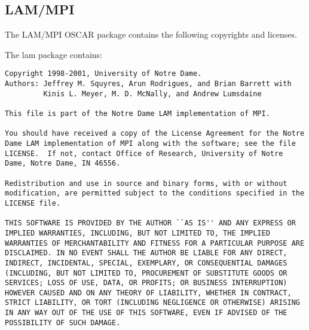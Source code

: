 %
%
%

\subsection{LAM/MPI}
The LAM/MPI OSCAR package contains the following copyrights and licenses.

The lam package contains:

\begin{verbatim}
Copyright 1998-2001, University of Notre Dame.
Authors: Jeffrey M. Squyres, Arun Rodrigues, and Brian Barrett with
         Kinis L. Meyer, M. D. McNally, and Andrew Lumsdaine

This file is part of the Notre Dame LAM implementation of MPI.

You should have received a copy of the License Agreement for the Notre
Dame LAM implementation of MPI along with the software; see the file
LICENSE.  If not, contact Office of Research, University of Notre
Dame, Notre Dame, IN 46556.

Redistribution and use in source and binary forms, with or without
modification, are permitted subject to the conditions specified in the
LICENSE file.

THIS SOFTWARE IS PROVIDED BY THE AUTHOR ``AS IS'' AND ANY EXPRESS OR
IMPLIED WARRANTIES, INCLUDING, BUT NOT LIMITED TO, THE IMPLIED
WARRANTIES OF MERCHANTABILITY AND FITNESS FOR A PARTICULAR PURPOSE ARE
DISCLAIMED. IN NO EVENT SHALL THE AUTHOR BE LIABLE FOR ANY DIRECT,
INDIRECT, INCIDENTAL, SPECIAL, EXEMPLARY, OR CONSEQUENTIAL DAMAGES
(INCLUDING, BUT NOT LIMITED TO, PROCUREMENT OF SUBSTITUTE GOODS OR
SERVICES; LOSS OF USE, DATA, OR PROFITS; OR BUSINESS INTERRUPTION)
HOWEVER CAUSED AND ON ANY THEORY OF LIABILITY, WHETHER IN CONTRACT,
STRICT LIABILITY, OR TORT (INCLUDING NEGLIGENCE OR OTHERWISE) ARISING
IN ANY WAY OUT OF THE USE OF THIS SOFTWARE, EVEN IF ADVISED OF THE
POSSIBILITY OF SUCH DAMAGE.
\end{verbatim}

